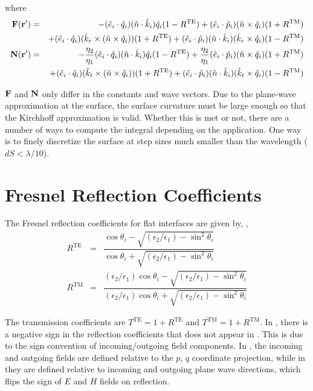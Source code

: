\noindent where
\begin{eqnarray}
\mathbf{F}(\mathbf{r}') &=&  - (\hat{e}_i \cdot \hat{q}_i )(\hat{n} \cdot \hat{k}_i) \hat{q}_i (1 - R^{\textrm{TE}}) + (\hat{e}_i \cdot \hat{p}_i )(\hat{n} \times \hat{q}_i) (1 + R^{\textrm{TM}}) \nonumber \\
\ & \ &+ (\hat{e}_i \cdot \hat{q}_i )(\hat{k}_r \times (\hat{n} \times \hat{q}_i)) (1 + R^{\textrm{TE}})  + (\hat{e}_i \cdot \hat{p}_i )(\hat{n} \cdot \hat{k}_i) (\hat{k}_r \times \hat{q}_i) (1 - R^{\textrm{TM}}) \\
\mathbf{N}(\mathbf{r}') &=&  - \dfrac{\eta_2}{\eta_1}(\hat{e}_i \cdot \hat{q}_i )(\hat{n} \cdot \hat{k}_i) \hat{q}_i (1 - R^{\textrm{TE}}) + \dfrac{\eta_2}{\eta_1}(\hat{e}_i \cdot \hat{p}_i )(\hat{n} \times \hat{q}_i) (1 + R^{\textrm{TM}}) \nonumber \\
\ & \ &+ (\hat{e}_i \cdot \hat{q}_i )(\hat{k}_t \times (\hat{n} \times \hat{q}_i)) (1 + R^{\textrm{TE}}) + (\hat{e}_i \cdot \hat{p}_i )(\hat{n} \cdot \hat{k}_i) (\hat{k}_t \times \hat{q}_i) (1 - R^{\textrm{TM}}) 
\end{eqnarray}

$\mathbf{F}$ and $\mathbf{N}$ only differ in the constants and wave vectors.  Due to the plane-wave approximation at the surface, the surface curvature must be large enough so that the Kirchhoff approximation is valid. Whether this is met or not, there are a number of ways to compute the integral depending on the application. One way is to finely discretize the surface at step sizes much smaller than the wavelength ($dS<\lambda/10$).  

\section{Fresnel Reflection Coefficients}
\label{fresenlref}
The Fresnel reflection coefficients for flat interfaces are given by, \cite{kong1986electromagnetic},
\begin{eqnarray}
R^{\textrm{TE}} &=& \dfrac{ \cos \theta_i - \sqrt{(\epsilon_2/\epsilon_1) - \sin^2\theta_i }}{\cos \theta_i + \sqrt{(\epsilon_2/\epsilon_1) - \sin^2\theta_i }} \\
R^{\textrm{TM}} &=& \dfrac{(\epsilon_2/\epsilon_1) \cos \theta_i - \sqrt{(\epsilon_2/\epsilon_1) - \sin^2\theta_i }}{(\epsilon_2/\epsilon_1) \cos \theta_i + \sqrt{(\epsilon_2/\epsilon_1) - \sin^2\theta_i }} 
\end{eqnarray}

The transmission coefficients are $T^{\textrm{TE}} = 1 + R^{\textrm{TE}}$ and $T^{\textrm{TM}} = 1 + R^{\textrm{TM}} $. In \cite{ulaby1999fundamentals}, there is a negative sign in the reflection coefficients that does not appear in \cite{kong1986electromagnetic}. This is due to the sign convention of incoming/outgoing field components. In \cite{kong1986electromagnetic}, the incoming and outgoing fields are defined relative to the $p$, $q$ coordinate projection, while in \cite{ulaby1999fundamentals} they are defined relative to incoming and outgoing plane wave directions, which flips the sign of $E$ and $H$ fields on reflection.  

